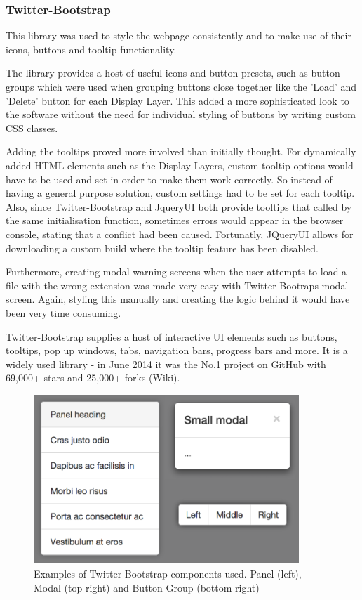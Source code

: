 \documentclass[a4paper,11pt,titlepage]{article}
\begin{document}
\subsubsection{Twitter-Bootstrap}

This library was used to style the webpage consistently and to make use of their icons, buttons and tooltip functionality.

The library provides a host of useful icons and button presets, such as button groups which were used when grouping buttons close together like the 'Load' and 'Delete' button for each Display Layer. This added a more sophisticated look to the software without the need for individual styling of buttons by writing custom CSS classes.

Adding the tooltips proved more involved than initially thought. For dynamically added HTML elements such as the Display Layers, custom tooltip options would have to be used and set in order to make them work correctly. So instead of having a general purpose solution, custom settings had to be set for each tooltip. Also, since Twitter-Bootstrap and JqueryUI both provide tooltips that called by the same initialisation function, sometimes errors would appear in the browser console, stating that a conflict had been caused. Fortunatly, JQueryUI allows for downloading a custom build where the tooltip feature has been disabled.

Furthermore, creating modal warning screens when the user attempts to load a file with the wrong extension was made very easy with Twitter-Bootraps modal screen. Again, styling this manually and creating the logic behind it would have been very time consuming.

Twitter-Bootstrap supplies a host of interactive UI elements such as buttons, tooltips, pop up windows, tabs, navigation bars, progress bars and more. It is a widely used library - in June 2014 it was the No.1 project on GitHub with 69,000+ stars and 25,000+ forks (Wiki).


\begin{figure}[ht!]
\centering
\includegraphics[width=100mm]{graphics/twitterBootstrap_01.png}
\caption{Examples of Twitter-Bootstrap components used. Panel (left), Modal (top right) and Button Group (bottom right)}
\label{fig:UIdesign1}
\end{figure}
\end{document}
